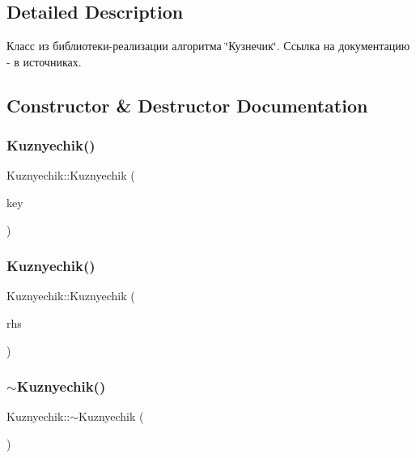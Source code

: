 \subsection{Detailed Description}
Класс из библиотеки-\/реализации алгоритма \char`\"{}Кузнечик\char`\"{}. Ссылка на документацию -\/ в источниках. 

\subsection{Constructor \& Destructor Documentation}
\mbox{\label{class_kuznyechik_a3fa49cd54a47b9cc2d5a32beabd05264}} 
\subsubsection{Kuznyechik()\hspace{0.1cm}{\footnotesize\ttfamily [1/2]}}
{\footnotesize\ttfamily Kuznyechik\+::\+Kuznyechik (\begin{DoxyParamCaption}\item[{const \textbf{ Byte\+Block} \&}]{key }\end{DoxyParamCaption})}

\mbox{\label{class_kuznyechik_a8e3a616991d823600e38d4a974124d1d}} 
\subsubsection{Kuznyechik()\hspace{0.1cm}{\footnotesize\ttfamily [2/2]}}
{\footnotesize\ttfamily Kuznyechik\+::\+Kuznyechik (\begin{DoxyParamCaption}\item[{const \textbf{ Kuznyechik} \&}]{rhs }\end{DoxyParamCaption})}

\mbox{\label{class_kuznyechik_a0dab125f7a2ba66559ee611256985c45}} 
\subsubsection{$\sim$\+Kuznyechik()}
{\footnotesize\ttfamily Kuznyechik\+::$\sim$\+Kuznyechik (\begin{DoxyParamCaption}{ }\end{DoxyParamCaption})}



